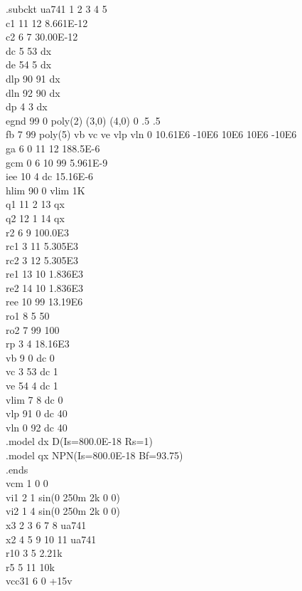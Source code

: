 \documentclass[12pt]{article}
\begin{document}
.subckt ua741    1  2  3  4  5\\
c1   11 12 8.661E-12\\
c2    6  7 30.00E-12\\
dc    5 53 dx\\
de   54  5 dx\\
dlp  90 91 dx\\
dln  92 90 dx\\
dp    4  3 dx\\
egnd 99  0 poly(2) (3,0) (4,0) 0 .5 .5\\
fb    7 99 poly(5) vb vc ve vlp vln 0 10.61E6 -10E6 10E6 10E6 -10E6\\
ga    6  0 11 12 188.5E-6\\
gcm   0  6 10 99 5.961E-9\\
iee  10  4 dc 15.16E-6\\
hlim 90  0 vlim 1K\\
q1   11  2 13 qx\\
q2   12  1 14 qx\\
r2    6  9 100.0E3\\
rc1   3 11 5.305E3\\
rc2   3 12 5.305E3\\
re1  13 10 1.836E3\\
re2  14 10 1.836E3\\
ree  10 99 13.19E6\\
ro1   8  5 50\\
ro2   7 99 100\\
rp    3  4 18.16E3\\
vb    9  0 dc 0\\
vc    3 53 dc 1\\
ve   54  4 dc 1\\
vlim  7  8 dc 0\\
vlp  91  0 dc 40\\
vln   0 92 dc 40\\
.model dx D(Is=800.0E-18 Rs=1)\\
.model qx NPN(Is=800.0E-18 Bf=93.75)\\
.ends\\
\newpage
vcm 1 0 0\\
vi1 2 1 sin(0 250m 2k 0 0)\\
vi2 1 4 sin(0 250m 2k 0 0)\\
x3 2 3 6 7 8 ua741\\
x2 4 5 9 10 11 ua741\\
r10 3 5 2.21k\\
r5 5 11 10k\\
vcc31 6 0 +15v\\
\end{document}
